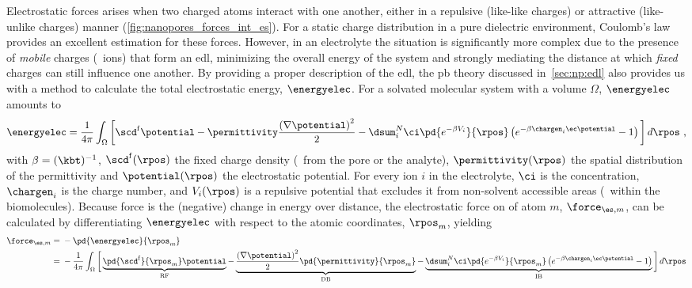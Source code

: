 Electrostatic forces arises when two charged atoms interact with one another, either in a repulsive (like-like
charges) or attractive (like-unlike charges) manner (\cref{fig:nanopores_forces_int_es}). For a static charge
distribution in a pure dielectric environment, Coulomb's law provides an excellent estimation for these
forces. However, in an electrolyte the situation is significantly more complex due to the presence of
\emph{mobile} charges (\ie~ions) that form an \gls{edl}, minimizing the overall energy of the system and
strongly mediating the distance at which \emph{fixed} charges can still influence one another. By providing a
proper description of the \gls{edl}, the \gls{pb} theory discussed in~\cref{sec:np:edl} also provides us with
a method to calculate the total electrostatic energy, $\energyelec$. For a solvated molecular system with a
volume $\Omega$, $\energyelec$ amounts to~\cite{Gilson-1993,Im-1998,Baker-2005}
%
\begin{align}\label{eq:nanopores_electrostatic_energy}
  \energyelec = 
  \dfrac{1}{4 \pi} \int_{\Omega}
  \bigg[
    \scd^{\rm{f}} \potential
    - \permittivity \dfrac{\left(\nabla \potential \right)^2}{2}
    - \dsum_{i}^{N} \ci \pd{ e^{- \beta V_i} }{\rpos}
                    \left( e^{ - \beta \chargen_i \ec \potential } - 1 \right)
  \bigg] \, d\rpos
  \text{ ,}
\end{align}
%
with $\beta = (\kbt)^{-1}$, $\scd^{\rm{f}}(\rpos)$ the fixed charge density (\ie~from the pore or the
analyte), $\permittivity(\rpos)$ the spatial distribution of the permittivity and $\potential(\rpos)$ the
electrostatic potential. For every ion $i$ in the electrolyte, $\ci$ is the concentration, $\chargen_i$ is the
charge number, and $V_i(\rpos)$ is a repulsive potential that excludes it from non-solvent accessible areas
(\eg~within the biomolecules). Because force is the (negative) change in energy over distance, the
electrostatic force on of atom $m$, $\force_{\es,m}$, can be calculated by differentiating $\energyelec$ with
respect to the atomic coordinates, $\rpos_m$, yielding~\cite{Gilson-1993,Im-1998,Baker-2005}
%
\begin{align}\label{eq:nanopores_electrostatic_force}
  \force_{\es,m} ={}& - \pd{\energyelec}{\rpos_m} \notag \\
    ={}& - \dfrac{1}{4 \pi} \int_{\Omega} \bigg[ 
      \underbrace{ \pd{\scd^{\rm{f}}}{\rpos_m} \potential }_{ \text{RF} }
      - \underbrace{ \dfrac{\left(\nabla \potential \right)^2}{2} 
      \pd{\permittivity}{\rpos_m} }_{ \text{DB} }
      - \underbrace{ \dsum_{i}^{N}
          \ci \pd{ e^{- \beta V_i} }{\rpos_m}
          \left( e^{ - \beta \chargen_i \ec \potential } - 1 \right) }_{ \text{IB} }
          \bigg] \, d\rpos
\end{align}
